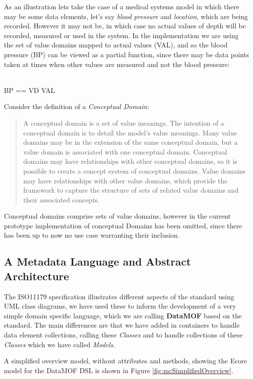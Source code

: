 As an illustration lets take the case of a medical systems model in which there may be some data elements, let's say \emph{blood pressure} and \emph{location}, which are being recorded.  However it may not be, in which case no actual values of depth will be recorded, measured or used in the system. In the implementation we are using the set of value domains mapped to actual values (VAL), and so the blood pressure (BP) can be viewed as a partial function, since there may be data points taken at times when other values are measured and not the blood pressure:
\begin{zed}
	[VAL]\\
	BP == VD \pfun VAL
\end{zed}
 
 

Consider the definition of a \emph{Conceptual Domain}:
\begin{quote}
	A conceptual domain is a set of value meanings. The intention of a conceptual domain is to detail the model's value meanings. Many value domains may be in the extension of the same conceptual domain, but a value domain is associated with one conceptual domain. Conceptual domains may have relationships with other conceptual domains, so it is possible to create a concept system of conceptual domains. Value domains may have relationships with other value domains, which provide the framework to capture the structure of sets of related value domains and their associated concepts.	
\end{quote}
Conceptual domains comprise sets of value domains, however in the current prototype implementation of conceptual Domains has been omitted, since there has been up to now no use case warranting their inclusion.

\subsection{A Metadata Language and Abstract Architecture }

The ISO11179 specification illustrates different aspects of the standard using UML class diagrams, we have used these to inform the development of a very simple domain specific language, which we are calling \textbf{DataMOF} based on the standard. The main differences are that we have added in containers to handle data element collections, calling these \emph{Classes} and to handle collections of these \emph{Classes} which we have called \emph{Models}.

A simplified overview model, without attributes and methods, showing the Ecore model for the DataMOF DSL is shown in Figure \ref{fig:mcSimplifiedOverview}.

